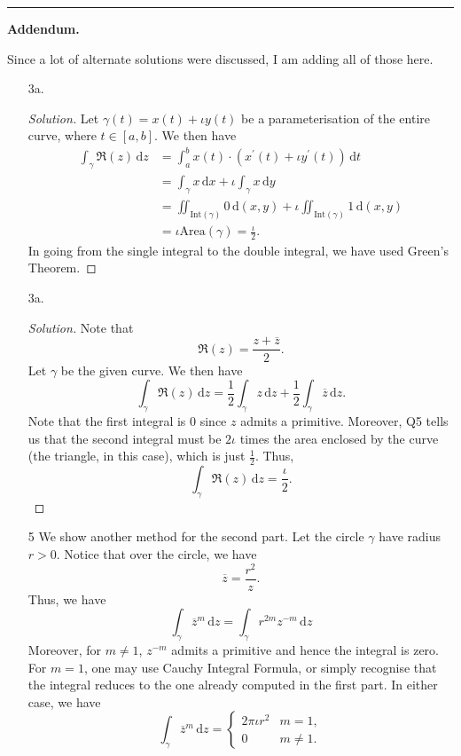 \documentclass[11pt]{article}
\theoremstyle{definition}
\newenvironment{soln}{\begin{proof}[Solution]}{\end{proof}}
\begin{document}
\par\noindent\rule{\textwidth}{0.4pt}

\textbf{Addendum.}

Since a lot of alternate solutions were discussed, I am adding all of those here.

\begin{enumerate}[leftmargin=*]
    \itemsep0.5em
    \item[3a.]\begin{soln}
Let $\gamma(t) = x(t) + \iota y(t)$ be a parameterisation of the entire curve, where $t \in [a,b]$. We then have
	    \begin{align*}
	        \int_{\gamma} \mathfrak{R}(z) \, \mathrm{d}z &= \int_a^b x(t) \cdot (x^{\prime}(t) + \iota y^{\prime}(t) ) \, \mathrm{d}t \\
	        &= \int_{\gamma} x \, \mathrm{d}x + \iota \int_{\gamma} x \, \mathrm{d}y \\
	        &= \iint_{\text{Int}(\gamma)} 0 \, \mathrm{d}(x,y) + \iota \iint_{\text{Int}(\gamma)} 1 \, \mathrm{d}(x,y) \\
	        &= \iota \text{Area}(\gamma) = \boxed{\frac{\iota}{2}}.
	    \end{align*}
	    In going from the single integral to the double integral, we have used Green's Theorem.
\end{soln}
\item[3a.]
\begin{soln}
Note that
\[
    \mathfrak{R}(z) = \frac{z+\overline{z}}{2}.
\]
Let $\gamma$ be the given curve. We then have
\[
    \int_{\gamma} \mathfrak{R}(z) \, \mathrm{d}z = \frac{1}{2} \int_{\gamma} z \, \mathrm{d}z + \frac{1}{2} \int_{\gamma} \overline{z} \, \mathrm{d}z.
\]
Note that the first integral is $0$ since $z$ admits a primitive. Moreover, Q5 tells us that the second integral must be $2\iota$ times the area enclosed by the curve (the triangle, in this case), which is just $\frac{1}{2}$. Thus, 
\[
    \int_{\gamma} \mathfrak{R}(z) \, \mathrm{d}z = \boxed{\frac{\iota}{2}}.
\]
\end{soln}

\item[5] We show another method for the second part. Let the circle $\gamma$ have radius $r > 0$. Notice that over the circle, we have
\[
    \overline{z} = \frac{r^2}{z}.
\]
Thus, we have
\[
    \int_{\gamma} \overline{z}^m \, \mathrm{d}z = \int_{\gamma} r^{2m} z^{-m} \, \mathrm{d}z
\]
Moreover, for $m \neq 1$, $z^{-m}$ admits a primitive and hence the integral is zero. For $m = 1$, one may use Cauchy Integral Formula, or simply recognise that the integral reduces to the one already computed in the first part. In either case, we have
\[
    \int_{\gamma} \overline{z}^m \, \mathrm{d}z = \begin{cases}
        2\pi\iota r^2 & m = 1, \\
        0 & m \neq 1.
    \end{cases}
\]
\end{enumerate}
\end{document}
